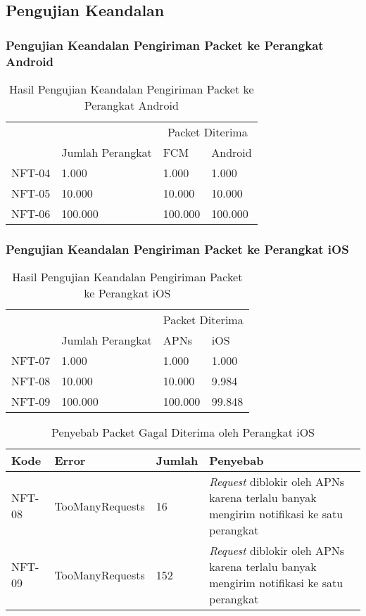 \subsection{Pengujian Keandalan}

\subsubsection{Pengujian Keandalan Pengiriman Packet ke Perangkat Android}
\begin{longtable}{|p{1.3cm}|p{3cm}|p{1.5cm}|p{1.5cm}|}
	\caption{Hasil Pengujian Keandalan Pengiriman Packet ke Perangkat Android} \label{t:keandalan_android} \\ \hline
	\rowcolor{gray!10} &  & \multicolumn{2}{c|}{Packet Diterima} \\ \hhline{~|~|*2{-}|}
	\rowcolor{gray!10} \multirow{-2}{*}{Kode} & \multirow{-2}{*}{Jumlah Perangkat} & FCM & Android \\ \hline
	NFT-04 & 1.000 & 1.000 & 1.000 \\ \hline
	NFT-05 & 10.000 & 10.000 & 10.000 \\ \hline
	NFT-06 & 100.000 & 100.000 & 100.000 \\ \hline
\end{longtable}

\subsubsection{Pengujian Keandalan Pengiriman Packet ke Perangkat iOS}
\begin{longtable}{|p{1.3cm}|p{3cm}|p{1.5cm}|p{1.5cm}|}
	\caption{Hasil Pengujian Keandalan Pengiriman Packet ke Perangkat iOS} \label{t:keandalan_ios} \\ \hline
	\rowcolor{gray!10} &  & \multicolumn{2}{c|}{Packet Diterima} \\ \hhline{~|~|*2{-}|}
	\rowcolor{gray!10} \multirow{-2}{*}{Kode} & \multirow{-2}{*}{Jumlah Perangkat} & APNs & iOS \\ \hline
	NFT-07 & 1.000 & 1.000 & 1.000 \\ \hline
	NFT-08 & 10.000 & 10.000 & 9.984 \\ \hline
	NFT-09 & 100.000 & 100.000 & 99.848 \\ \hline
\end{longtable}
\begin{longtable}{|p{1.3cm}|p{3cm}|p{1cm}|p{3cm}|}
	\caption{Penyebab Packet Gagal Diterima oleh Perangkat iOS} \label{t:keandalan_ios} \\ \hline
	\rowcolor{gray!10} Kode & Error & Jumlah & Penyebab \\ \hline
	NFT-08 & TooManyRequests & 16 & \textit{Request} diblokir oleh APNs karena terlalu banyak mengirim notifikasi ke satu perangkat \\ \hline
	NFT-09 & TooManyRequests & 152 & \textit{Request} diblokir oleh APNs karena terlalu banyak mengirim notifikasi ke satu perangkat \\ \hline
\end{longtable}

